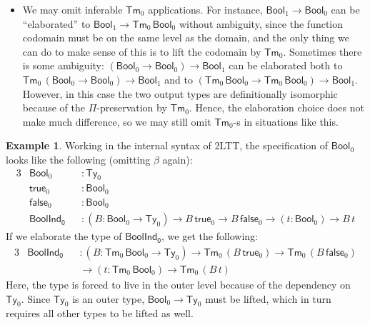 \documentclass[12pt,a4paper,twoside,openany]{book}
\theoremstyle{remark}
\newtheorem{notation}{Notation}
\theoremstyle{definition}
\newtheorem{myexample}{Example}
\theoremstyle{theorem}
\newcommand{\ms}[1]{\mathsf{#1}}
\newcommand{\suc}{\ms{suc}}
\newcommand{\Tm}{\mathsf{Tm}}
\newcommand{\Ty}{\mathsf{Ty}}
\newcommand{\Nat}{\ms{Nat}}
\newcommand{\Bool}{\ms{Bool}}
\newcommand{\lam}{\ms{lam}}
\newcommand{\true}{\ms{true}}
\newcommand{\false}{\ms{false}}
\begin{document}
\begin{itemize}
\begin{notation}
      $\lam_0\,(\lambda\,x.\,\suc_0\,(\suc_0\,x)) : \Tm_0\,(\Nat_0 \to
      \Nat_0)$. Instead of this, we write $\lambda_0\,x.\,t$ as a notation, thus
      we write $\lambda_0\,x.\,\suc_0\,(\suc_0\,x)$ for the above example. We
      may also group multiple $\lambda_0$ binders together the same way as with
      $\lambda$.
    \end{notation}
  \item
    We may omit inferable $\Tm_0$ applications. For instance, $\Bool_1 \to
    \Bool_0$ can be ``elaborated'' to $\Bool_1 \to \Tm_0\,\Bool_0$ without
    ambiguity, since the function codomain must be on the same level as the
    domain, and the only thing we can do to make sense of this is to lift the
    codomain by $\Tm_0$. Sometimes there is some ambiguity: $(\Bool_0 \to
    \Bool_0) \to \Bool_1$ can be elaborated both to $\Tm_0\,(\Bool_0 \to
    \Bool_0) \to \Bool_1$ and to $(\Tm_0\,\Bool_0 \to \Tm_0\,\Bool_0) \to
    \Bool_1$. However, in this case the two output types are definitionally
    isomorphic because of the $\Pi$-preservation by $\Tm_0$. Hence, the
    elaboration choice does not make much difference, so we may still omit
    $\Tm_0$-s in situations like this.
\end{itemize}

\begin{myexample} Working in the internal syntax of 2LTT, the specification of $\Bool_0$
looks like the following (omitting $\beta$ again):
\begin{alignat*}{3}
  &\Bool_0  &&: \Ty_0\\
  &\true_0  &&: \Bool_0\\
  &\false_0 &&: \Bool_0\\
  & \ms{BoolInd_0} &&: (B : \Bool_0 \to \Ty_0) \to B\,\true_0 \to B\,\false_0 \to (t : \Bool_0) \to B\,t
\end{alignat*}
If we elaborate the type of $\ms{BoolInd_0}$, we get the following:
\begin{alignat*}{3}
  & \ms{BoolInd_0} &&: (B : \Tm_0\,\Bool_0 \to \Ty_0) \to \Tm_0\,(B\,\true_0) \to \Tm_0\,(B\,\false_0)\\
  & && \to (t : \Tm_0\,\Bool_0) \to \Tm_0\,(B\,t)
\end{alignat*}
Here, the type is forced to live in the outer level because of the dependency on
$\Ty_0$. Since $\Ty_0$ is an outer type, $\Bool_0 \to \Ty_0$ must be lifted, which
in turn requires all other types to be lifted as well.
\end{myexample}
\end{document}
